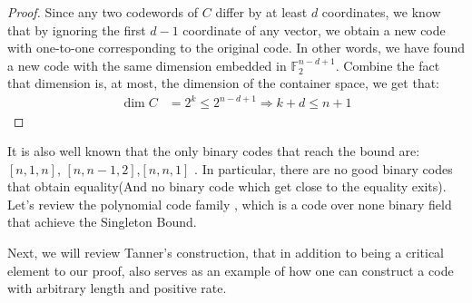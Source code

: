 \begin{proof} Since any two codewords of $C$ differ by at least $d$ coordinates, we know that by ignoring the first $d-1$ coordinate of any vector, we obtain a new code with one-to-one corresponding to the original code. In other words, we have found a new code with the same dimension embedded in $\mathbb{F}_{2}^{n-d+1}$. Combine the fact that dimension is, at most, the dimension of the container space, we get that:  
  \begin{equation*}
    \begin{split}
      \dim C &= 2^{k} \le 2^{n-d+1} \Rightarrow k+d \le n + 1
    \end{split}
  \end{equation*}
\end{proof}

It is also well known that the only binary codes that reach the bound are: $[n,1,n]$, $[n,n-1,2]$,$[n,n,1]$ \cite{eczoo_mds}. In particular, there are no good binary codes that obtain equality(And no binary code which get close to the equality exits). Let's review the polynomial code family \cite{Reed1960PolynomialCO}, which is a code over none binary field that achieve the Singleton Bound. 

\ifdefined\LDPCLTC
 
\fi

Next, we will review Tanner's construction, that in addition to being a critical element to our proof, also serves as an example of how one can construct a code with arbitrary length and positive rate.

